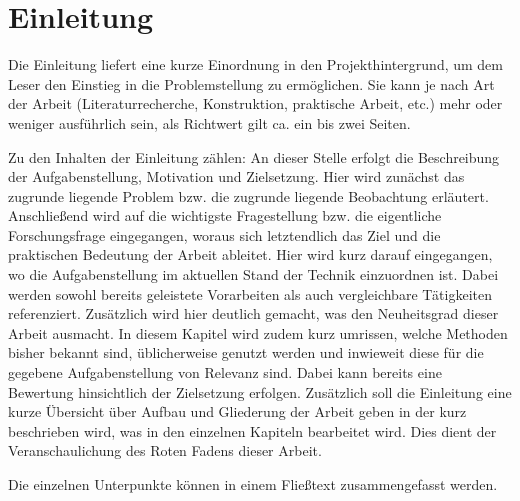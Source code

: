 \chapter{Einleitung}
\label{chap:Intro}
Die Einleitung liefert eine kurze Einordnung in den Projekthintergrund, um dem Leser den Einstieg in die Problemstellung zu ermöglichen. Sie kann je nach Art der Arbeit (Literaturrecherche, Konstruktion, praktische Arbeit, etc.) mehr oder weniger ausführlich sein, als Richtwert gilt ca. ein bis zwei Seiten.

Zu den Inhalten der Einleitung zählen:
%
An dieser Stelle erfolgt die Beschreibung der Aufgabenstellung, Motivation und Zielsetzung. Hier wird zunächst das zugrunde liegende Problem bzw. die zugrunde liegende Beobachtung erläutert. Anschließend wird auf die wichtigste Fragestellung bzw. die eigentliche Forschungsfrage eingegangen, woraus sich letztendlich das Ziel und die praktischen Bedeutung der Arbeit ableitet.
%
Hier wird kurz darauf eingegangen, wo die Aufgabenstellung im aktuellen Stand der Technik einzuordnen ist. Dabei werden sowohl bereits geleistete Vorarbeiten als auch vergleichbare Tätigkeiten referenziert. Zusätzlich wird hier deutlich gemacht, was den Neuheitsgrad dieser Arbeit ausmacht.
In diesem Kapitel wird zudem kurz umrissen, welche Methoden bisher bekannt sind, üblicherweise genutzt werden und inwieweit diese für die gegebene Aufgabenstellung von Relevanz sind. Dabei kann bereits eine Bewertung hinsichtlich der Zielsetzung erfolgen.
%
Zusätzlich soll die Einleitung eine kurze Übersicht über Aufbau und Gliederung der Arbeit geben in der kurz beschrieben wird, was in den einzelnen Kapiteln bearbeitet wird. Dies dient der Veranschaulichung des Roten Fadens dieser Arbeit.

Die einzelnen Unterpunkte können in einem Fließtext zusammengefasst werden.


